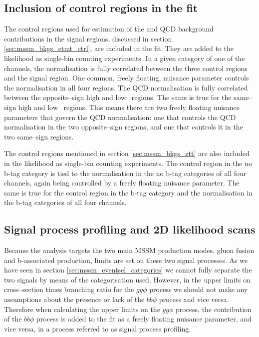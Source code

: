 \subsection{Inclusion of control regions in the fit}
\label{sec:mssm_sigext_ctrl}
The control regions used for estimation of the 
\Wjets and QCD background contributions in the signal regions, discussed
in section \ref{sec:mssm_bkgs_etmt_ctrl}, are included in the fit. They
are added to the likelihood as single-bin counting experiments. In a given
category of one of the channels, the \Wjets
normalisation is fully correlated between the three control 
regions and the signal region. One common, freely floating, nuisance parameter
controls the \Wjets normalisation in all four regions. The QCD normalisation
is fully correlated between the opposite--sign high and low \mT~regions. The
same is true for the same--sign high and low \mT~regions. This means there are
two freely floating nuisance parameters that govern the QCD normalisation: one
that controls the QCD normalisation in the two opposite--sign regions, and one
that controls it in the two same--sign regions. 

The \Zmm control regions mentioned in section \ref{sec:mssm_bkgs_ztt}
are also included in the likelihood as single-bin counting experiments.
The \Zmm control region in the no b-tag category is tied
to the \Ztautau normalisation in the no b-tag categories of all four
channels, again being controlled by a freely floating nuisance parameter. 
The same is true for the \Zmm control region in the b-tag category
and the \Ztautau normalisation in the b-tag categories of all four channels.

\subsection{Signal process profiling and 2D likelihood scans}
\label{sec:mssm_sigext_profile}
Because the analysis targets the two main MSSM production modes, gluon fusion and
b-associated production, limits are set on these two signal processes. As we
have seen in section \ref{sec:mssm_eventsel_categories}  we cannot fully separate the two signals by means
of the categorisation used. 
However, in the upper limits on cross--section times branching ratio for the $gg\phi$
process we should not make any assumptions about the presence or lack of the $bb\phi$
process and vice versa. Therefore when calculating the upper limits on the $gg\phi$
process, the contribution of the $bb\phi$ process is added to the fit as a freely floating nuisance
parameter, and vice versa, in a process referred to as signal process profiling. 

